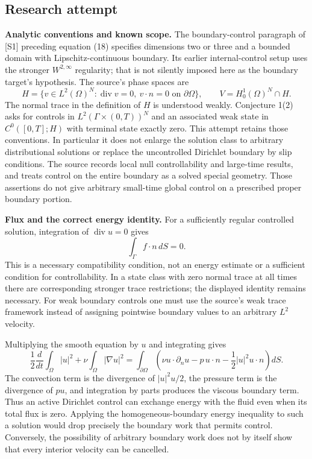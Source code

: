 \documentclass[11pt]{article}
\begin{document}
\subsection{Research attempt}
\textbf{Analytic conventions and known scope.}
The boundary-control paragraph of [S1] preceding equation (18) specifies
dimensions two or three and a bounded domain with Lipschitz-continuous
boundary.  Its earlier internal-control setup uses the stronger
$W^{2,\infty}$ regularity; that is not silently imposed here as the
boundary target's hypothesis.  The source's phase spaces are
\[
 H=\{v\in L^2(\Omega)^N:\operatorname{div}v=0,
                     \ v\cdot n=0\text{ on }\partial\Omega\},\qquad
 V=H_0^1(\Omega)^N\cap H.
\]
The normal trace in the definition of $H$ is understood weakly.
Conjecture 1(2) asks for controls in $L^2(\Gamma\times(0,T))^N$ and an
associated weak state in $C^0([0,T];H)$ with terminal state exactly zero.
This attempt retains those conventions.  In particular it does not enlarge
the solution class to arbitrary distributional solutions or replace the
uncontrolled Dirichlet boundary by slip conditions.  The source records local
null controllability and large-time results, and treats control on the entire
boundary as a solved special geometry.  Those assertions do not give arbitrary
small-time global control on a prescribed proper boundary portion.

\textbf{Flux and the correct energy identity.}
For a sufficiently regular controlled solution, integration of
$\operatorname{div}u=0$ gives
\[
 \int_\Gamma f\cdot n\,dS=0.
\]
This is a necessary compatibility condition, not an energy estimate or a
sufficient condition for controllability.  In a state class with zero normal
trace at all times there are corresponding stronger trace restrictions; the
displayed identity remains necessary.  For weak boundary controls one must
use the source's weak trace framework instead of assigning pointwise boundary
values to an arbitrary $L^2$ velocity.

Multiplying the smooth equation by $u$ and integrating gives
\[
 \frac12\frac d{dt}\int_\Omega|u|^2
 +\nu\int_\Omega|\nabla u|^2
 =\int_{\partial\Omega}
 \left(\nu u\cdot\partial_nu-p\,u\cdot n
                     -\frac12|u|^2u\cdot n\right)dS.
\]
The convection term is the divergence of $|u|^2u/2$, the pressure term is
the divergence of $pu$, and integration by parts produces the viscous
boundary term.  Thus an active Dirichlet control can exchange energy with the
fluid even when its total flux is zero.  Applying the homogeneous-boundary
energy inequality to such a solution would drop precisely the boundary work
that permits control.  Conversely, the possibility of arbitrary boundary
work does not by itself show that every interior velocity can be cancelled.
\end{document}
